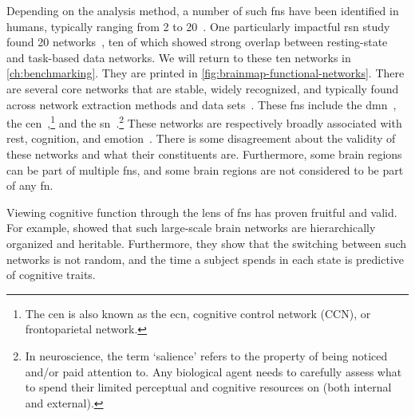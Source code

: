 Depending on the analysis method, a number of such \glspl{fn} have been identified in humans, typically ranging from 2 to 20~\parencite{Yeo2011, Heine2012, Glomb2017}.
One particularly impactful \gls{rsn} study found 20 networks~\parencite{Smith2009, Laird2011}, ten of which showed strong overlap between resting-state and task-based data networks.
We will return to these ten networks in \cref{ch:benchmarking}.
They are printed in \cref{fig:brainmap-functional-networks}.
%
There are several core networks that are stable, widely recognized, and typically found across network extraction methods and data sets~\parencite{Uddin2019}.
These \glspl{fn} include the \gls{dmn}~\parencite{Raichle2001, Raichle2007, Vatansever2015}, the \gls{cen}~\parencite{Rogers2004},\footnote{The \gls{cen} is also known as the \gls{ecn}, cognitive control network (CCN), or frontoparietal network.} and the \gls{sn}~\parencite{Drevets2000, Seeley2007}.\footnote{In neuroscience, the term `salience' refers to the property of being noticed and/or paid attention to. Any biological agent needs to carefully assess what to spend their limited perceptual and cognitive resources on (both internal and external).}
These networks are respectively broadly associated with rest, cognition, and emotion~\parencite{Uddin2019}.
%
There is some disagreement about the validity of these networks and what their constituents are.
Furthermore, some brain regions can be part of multiple \glspl{fn}, and some brain regions are not considered to be part of any \gls{fn}.

Viewing cognitive function through the lens of \glspl{fn} has proven fruitful and valid.
For example, \textcite{Vidaurre2017} showed that such large-scale brain networks are hierarchically organized and heritable.
Furthermore, they show that the switching between such networks is not random, and the time a subject spends in each state is predictive of cognitive traits.
